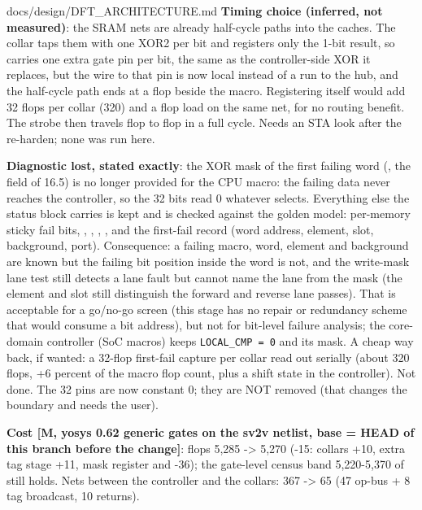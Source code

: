 \begin{relocated}{docs/design/DFT_ARCHITECTURE.md}
\textbf{Timing choice (inferred, not measured)}: the SRAM 
nets are already half-cycle paths into the caches. The collar taps them
with one XOR2 per bit and registers only the 1-bit result, so
 carries one extra gate pin per bit, the same as the
controller-side XOR it replaces, but the wire to that pin is now local
instead of a run to the hub, and the half-cycle path ends at a flop
beside the macro. Registering  itself would add 32 flops per
collar (320) and a flop load on the same net, for no routing benefit.
The strobe then travels flop to flop in a full cycle. Needs an STA look
after the re-harden; none was run here.

\textbf{Diagnostic lost, stated exactly}: the XOR mask of the first
failing word (, the  field of 16.5)
is no longer provided for the CPU macro: the failing data never reaches
the controller, so the 32 bits read 0 whatever  selects.
Everything else the status block carries is kept and is checked against
the golden model: per-memory sticky fail bits, ,
, , , and the first-fail record
(word address, element, slot, background, port). Consequence: a failing
macro, word, element and background are known but the failing bit
position inside the word is not, and the write-mask lane test still
detects a lane fault but cannot name the lane from the mask (the element
and slot still distinguish the forward and reverse lane passes). That is
acceptable for a go/no-go screen (this stage has no repair or redundancy
scheme that would consume a bit address), but not for bit-level failure
analysis; the core-domain controller (SoC macros) keeps
\texttt{LOCAL\_\allowbreak{}CMP\ =\allowbreak{}\ 0} and its mask. A
cheap way back, if wanted: a 32-flop first-fail capture per collar read
out serially (about 320 flops, +6 percent of the macro flop count, plus
a shift state in the controller). Not done. The 32
 pins are now constant 0; they are NOT
removed (that changes the boundary and needs the user).

\textbf{Cost {[}M, yosys 0.62 generic gates on the sv2v netlist, base =
HEAD of this branch before the change{]}}: flops 5,285 -\textgreater{}
5,270 (-15: collars +10, extra tag stage +11, mask register and
 -36); the gate-level census band 5,220-5,370 of
 still holds. Nets between the
controller and the collars: 367 -\textgreater{} 65 (47 op-bus + 8 tag
broadcast, 10 returns).


\end{relocated}
